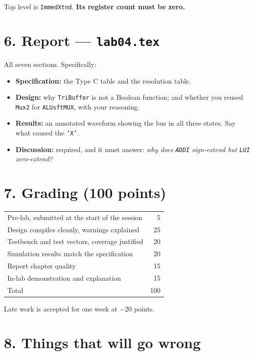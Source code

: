 \documentclass[11pt]{article}
\newcommand{\code}[1]{\texttt{#1}}
\begin{document}
Top level is \code{ImmedXtnd}. \textbf{Its register count must be zero.}

\section*{6. Report --- \code{lab04.tex}}

All seven sections. Specifically:

\begin{itemize}[leftmargin=1.6em,itemsep=1pt]
\item \textbf{Specification:} the Type C table and the resolution table.
\item \textbf{Design:} why \code{TriBuffer} is not a Boolean function; and
whether you reused \code{Mux2} for \code{ALUsftMUX}, with your reasoning.
\item \textbf{Results:} an annotated waveform showing the bus in all three
states. Say what caused the \code{'X'}.
\item \textbf{Discussion:} required, and it must answer: \emph{why does
\code{ADDI} sign-extend but \code{LUI} zero-extend?}
\end{itemize}

\section*{7. Grading (100 points)}

\begin{center}
\begin{tabular}{lr}
\toprule
Pre-lab, submitted at the start of the session & 5 \\
Design compiles cleanly, warnings explained & 25 \\
Testbench and test vectors, coverage justified & 20 \\
Simulation results match the specification & 20 \\
Report chapter quality & 15 \\
In-lab demonstration and explanation & 15 \\
\midrule
Total & 100 \\
\bottomrule
\end{tabular}
\end{center}

Late work is accepted for one week at $-20$ points.

\section*{8. Things that will go wrong}
\end{document}
